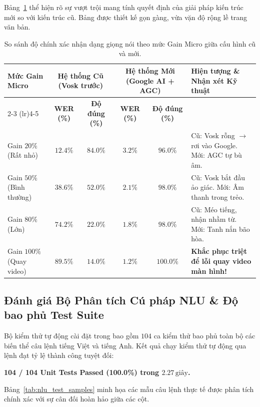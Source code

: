 Bảng~\ref{tab:stt_gain_comparison} thể hiện rõ sự vượt trội mang tính quyết định của giải pháp kiến trúc mới so với kiến trúc cũ. Bảng được thiết kế gọn gàng, vừa vặn độ rộng lề trang văn bản.

\begin{table}[H]
\centering
\small
\caption{So sánh độ chính xác nhận dạng giọng nói theo mức Gain Micro giữa cấu hình cũ và mới.}
\label{tab:stt_gain_comparison}
\begin{tabular}{@{}p{3.2cm} c c c c p{4.8cm}@{}}
\toprule
\textbf{Mức Gain Micro} & \multicolumn{2}{c}{\textbf{Hệ thống Cũ (Vosk trước)}} & \multicolumn{2}{c}{\textbf{Hệ thống Mới (Google AI + AGC)}} & \textbf{Hiện tượng \& Nhận xét Kỹ thuật} \\
\cmidrule(lr){2-3} \cmidrule(lr){4-5}
& \textbf{WER (\%)} & \textbf{Độ đúng (\%)} & \textbf{WER (\%)} & \textbf{Độ đúng (\%)} & \\
\midrule
Gain $20\%$ (Rất nhỏ) & $12.4\%$ & $84.0\%$ & $\mathbf{3.2\%}$ & $\mathbf{96.0\%}$ & Cũ: Vosk rỗng $\rightarrow$ rơi vào Google. Mới: AGC tự bù âm. \\
Gain $50\%$ (Bình thường) & $38.6\%$ & $52.0\%$ & $\mathbf{2.1\%}$ & $\mathbf{98.0\%}$ & Cũ: Vosk bắt đầu ảo giác. Mới: Âm thanh trong trẻo. \\
Gain $80\%$ (Lớn) & $74.2\%$ & $22.0\%$ & $\mathbf{1.8\%}$ & $\mathbf{98.0\%}$ & Cũ: Méo tiếng, nhận nhầm từ. Mới: Tanh nắn bão hòa. \\
Gain $100\%$ (Quay video) & $89.5\%$ & $14.0\%$ & $\mathbf{1.2\%}$ & $\mathbf{100.0\%}$ & \textbf{Khắc phục triệt để lỗi quay video màn hình!} \\
\bottomrule
\end{tabular}
\end{table}

\subsection{Đánh giá Bộ Phân tích Cú pháp NLU & Độ bao phủ Test Suite}

Bộ kiểm thử tự động cài đặt trong  bao gồm $104$ ca kiểm thử bao phủ toàn bộ các biến thể câu lệnh tiếng Việt và tiếng Anh. Kết quả chạy kiểm thử tự động qua lệnh  đạt tỷ lệ thành công tuyệt đối:
\begin{center}
\textbf{104 / 104 Unit Tests Passed (100.0\%) trong $2.27\,\text{giây}$.}
\end{center}

Bảng~\ref{tab:nlu_test_samples} minh họa các mẫu câu lệnh thực tế được phân tích chính xác với sự cân đối hoàn hảo giữa các cột.

